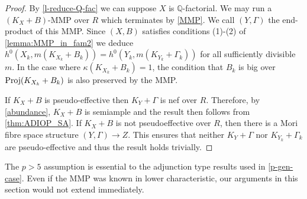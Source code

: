 	\begin{proof}
		By \autoref{l-reduce-Q-fac} we can suppose $X$ is $\mathbb{Q}$-factorial.
		We may run a $(K_X+B)$-MMP over $R$ which terminates by \autoref{MMP}. 
		We call $(Y,\Gamma)$ the end-product of this MMP. Since $(X,B)$ satisfies conditions (1)-(2) of \autoref{lemma:MMP_in_fam2} we deduce $h^{0}(X_{k},m(K_{X_{k}} + B_{k}))=h^0(Y_k, m(K_{Y_k}+\Gamma_k))$ for all sufficiently divisible $m$. 
		In the case where $\kappa(K_{X_{k}}+B_{k})=1$, the condition that $B_{k}$ is big over $\textup{Proj}(K_{X_{k}}+B_{k})$ is also preserved by the MMP.
		
		If $K_{X}+B$ is pseudo-effective then $K_Y+\Gamma$ is nef over $R$. Therefore, by \autoref{abundance}, $K_{X}+B$ is semiample and the result then follows from \autoref{thm:ADIOP_SA}. 
		If $K_X+B$ is not pseudoeffective over $R$, then there is a Mori fibre space structure $(Y,\Gamma) \to Z$. This ensures that neither $K_{Y}+\Gamma$ nor $K_{Y_{k}}+\Gamma_{k}$ are pseudo-effective and thus the result holds trivially. 
	\end{proof}
	
	
	\begin{remark}	
		The $p>5$ assumption is essential to the adjunction type results used in \autoref{p-gen-case}. Even if the MMP was known in lower characteristic, our arguments in this section would not extend immediately.
	\end{remark}

%	
%	
%	
%


